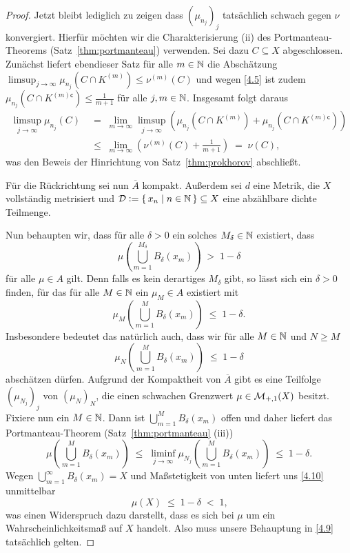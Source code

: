 \documentclass[../main/main.tex]{subfiles}
\begin{document}
\begin{proof}
		Jetzt bleibt lediglich zu zeigen dass $(\mu_{n_j})_j$ tatsächlich schwach gegen $\nu$ konvergiert. 
		Hierfür möchten wir die Charakterisierung (ii) des Portmanteau-Theorems (Satz~\ref{thm:portmanteau}) verwenden.
		Sei dazu $C \subseteq X$ abgeschlossen. Zunächst liefert ebendieser Satz für alle $m \in \mathbb{N}$ die 
		Abschätzung $\limsup_{j \to \infty} \mu_{n_j}(C \cap K^{(m)}) \leq \nu^{(m)}(C)$ und wegen \eqref{4.5} ist 
		zudem $\mu_{n_j}(C \cap K^{(m) \mathsf{c}}) \leq  \frac{1}{m+1}$ für alle $j, m \in \mathbb{N}$. Insgesamt folgt daraus 
		\begin{align*}
			\limsup_{j \to \infty} \mu_{n_j}(C) \; &=    \; \lim_{m \to \infty} \limsup_{j \to \infty} 
														\left( \mu_{n_j}(C \cap K^{(m)}) + \mu_{n_j}(C \cap K^{(m) \mathsf{c}}) \right) \\
			                                       &\leq \; \lim_{m \to \infty} \left( \nu^{(m)}(C) + \frac{1}{m+1} \right) 
			                                       		\; = \; \nu(C) \text{,}
		\end{align*}
		was den Beweis der Hinrichtung von Satz~\ref{thm:prokhorov} abschließt.
		
		Für die Rückrichtung sei nun $\overline{A}$ kompakt. Außerdem sei $d$ eine Metrik, die $X$ vollständig metrisiert 
		und $\mathcal{D} \vcentcolon = \left\{\, x_n \; \middle| \; n \in \mathbb{N} \,\right\} \subseteq X$ eine abzählbare dichte Teilmenge.
		
		Nun behaupten wir, dass für alle $\delta > 0$ ein solches $M_\delta \in \mathbb{N}$ existiert, dass
		\[ \mu(\bigcup_{m=1}^{M_\delta} B_\delta(x_m)) \; > \; 1 - \delta \label{4.9} \tag{4.9} \]
		für alle $\mu \in A$ gilt. Denn falls es kein derartiges $M_\delta$ gibt, so lässt sich ein $\delta > 0$ finden, für das
		für alle $M \in \mathbb{N}$ ein $\mu_M \in A$ existiert mit
		\[ \mu_M(\bigcup_{m=1}^{M} B_\delta(x_m)) \; \leq \; 1 - \delta \text{.} \]
		Insbesondere bedeutet das natürlich auch, dass wir für alle $M \in \mathbb{N}$ und $N \geq M$ 
		\[ \mu_N(\bigcup_{m=1}^{M} B_\delta(x_m)) \; \leq \; 1 - \delta \]
		abschätzen dürfen. Aufgrund der Kompaktheit von $\overline{A}$ gibt es eine Teilfolge $(\mu_{N_j})_j$ von $(\mu_N)_N$, 
		die einen schwachen Grenzwert $\mu \in \mathcal{M}_{+,1}(X)$ besitzt. Fixiere nun ein $M \in \mathbb{N}$. 
		Dann ist $\bigcup_{m=1}^{M} B_\delta(x_m)$
		offen und daher liefert das Portmanteau-Theorem (Satz~\ref{thm:portmanteau} (iii))
		\[ \mu(\bigcup_{m=1}^{M} B_\delta(x_m)) 
			\; \leq \; \liminf_{j \to \infty} \mu_{N_j}(\bigcup_{m=1}^{M} B_\delta(x_m)) 
			\; \leq \; 1 - \delta \text{.} \label{4.10} \tag{4.10} \]
		Wegen $\bigcup_{m=1}^{\infty} B_\delta(x_m) = X$ und Maßstetigkeit von unten 
		liefert uns \eqref{4.10} unmittelbar 
		\[ \mu(X) \; \leq \; 1 - \delta \; < \; 1 \text{,} \]
		was einen Widerspruch dazu darstellt, dass es sich bei $\mu$ um ein 
		Wahrscheinlichkeitsmaß auf $X$ handelt. Also muss unsere Behauptung in \eqref{4.9} tatsächlich gelten.
		

\end{proof}
\end{document}
